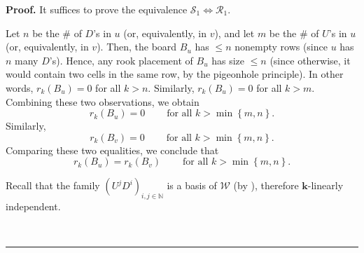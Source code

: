 \documentclass[numbers=enddot,12pt,final,onecolumn,notitlepage]{scrartcl}%
\theoremstyle{definition}
\newenvironment{proof}[1][Proof]{\noindent\textbf{#1.} }{\ \rule{0.5em}{0.5em}}
\newcommand{\W}{\mathcal{W}}
\newcommand{\kk}{\mathbf{k}}
\newcommand{\NN}{\mathbb{N}}
\begin{document}
\begin{proof}
It suffices to prove the equivalence $\mathcal{S}_{1}\Longleftrightarrow
\mathcal{R}_1$.

Let $n$ be the \# of $D$'s in $u$ (or, equivalently, in $v$), and let $m$ be
the \# of $U$'s in $u$ (or, equivalently, in $v$). Then, the board $B_{u}$ has
$\leq n$ nonempty rows (since $u$ has $n$ many $D$'s). Hence, any rook placement of
$B_{u}$ has size $\leq n$ (since otherwise, it would contain two cells in the
same row, by the pigeonhole principle). In other words, $r_{k}\left(
B_{u}\right)  =0$ for all $k>n$. Similarly, $r_{k}\left(  B_{u}\right)  =0$
for all $k>m$. Combining these two observations, we obtain%
\begin{equation}
r_{k}\left(  B_{u}\right)  =0\ \ \ \ \ \ \ \ \ \ \text{for all }k>\min\left\{
m,n\right\}  .\label{pf.thm.DU-eqs3.1}%
\end{equation}
Similarly,%
\begin{equation}
r_{k}\left(  B_{v}\right)  =0\ \ \ \ \ \ \ \ \ \ \text{for all }k>\min\left\{
m,n\right\}  .\label{pf.thm.DU-eqs3.2}%
\end{equation}
Comparing these two equalities, we conclude that%
\begin{equation}
r_{k}\left(  B_{u}\right)  =r_{k}\left(  B_{v}\right)
\ \ \ \ \ \ \ \ \ \ \text{for all }k>\min\left\{  m,n\right\}
.\label{pf.thm.DU-eqs3.1=2}%
\end{equation}


Recall that the family $\left(  U^{j}D^{i}\right)  _{i,j\in\NN}$ is a
basis of $\W$ (by \cite[Proposition 2.7.1 (i)]{Etingof}), therefore
$\kk$-linearly independent.


\end{proof}
\end{document}
